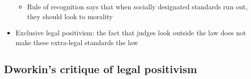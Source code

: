 \begin{itemize}
  \begin{itemize}
  \tightlist
  \item
    Rule of recognition says that when socially designated standards run
    out, they should look to morality
  \end{itemize}
\item
  Exclusive legal positivism: the fact that judges look outside the law
  does not make these extra-legal standards the law
\end{itemize}

\hypertarget{dworkins-critique-of-legal-positivism}{%
\subsection{Dworkin's critique of legal
positivism}\label{dworkins-critique-of-legal-positivism}}


